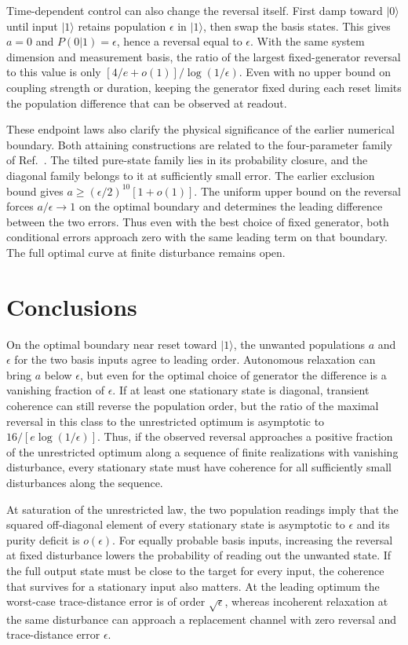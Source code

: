 \documentclass[aps,pra,reprint,amsmath,amssymb,nofootinbib,floatfix,longbibliography]{revtex4-2}
\theoremstyle{aps}
\newcommand{\eps}{\epsilon}
\newcommand{\ket}[1]{|#1\rangle}
\begin{document}
Time-dependent control can also change the reversal itself. First damp toward $\ket0$ until input $\ket1$ retains population $\eps$ in $\ket1$, then swap the basis states. This gives $a=0$ and $P(0|1)=\eps$, hence a reversal equal to $\eps$. With the same system dimension and measurement basis, the ratio of the largest fixed-generator reversal to this value is only $[4/e+o(1)]/\log(1/\eps)$. Even with no upper bound on coupling strength or duration, keeping the generator fixed during each reset limits the population difference that can be observed at readout.

These endpoint laws also clarify the physical significance of the earlier numerical boundary. Both attaining constructions are related to the four-parameter family of Ref.~\cite{Shahbeigi2024}. The tilted pure-state family lies in its probability closure, and the diagonal family belongs to it at sufficiently small error. The earlier exclusion bound gives $a\ge(\eps/2)^{10}[1+o(1)]$. The uniform upper bound on the reversal forces $a/\eps\to1$ on the optimal boundary and determines the leading difference between the two errors. Thus even with the best choice of fixed generator, both conditional errors approach zero with the same leading term on that boundary. The full optimal curve at finite disturbance remains open.

\section{Conclusions}\label{sec:conclusions}

On the optimal boundary near reset toward $\ket1$, the unwanted populations $a$ and $\eps$ for the two basis inputs agree to leading order. Autonomous relaxation can bring $a$ below $\eps$, but even for the optimal choice of generator the difference is a vanishing fraction of $\eps$. If at least one stationary state is diagonal, transient coherence can still reverse the population order, but the ratio of the maximal reversal in this class to the unrestricted optimum is asymptotic to $16/[e\log(1/\eps)]$. Thus, if the observed reversal approaches a positive fraction of the unrestricted optimum along a sequence of finite realizations with vanishing disturbance, every stationary state must have coherence for all sufficiently small disturbances along the sequence.

At saturation of the unrestricted law, the two population readings imply that the squared off-diagonal element of every stationary state is asymptotic to $\eps$ and its purity deficit is $o(\eps)$. For equally probable basis inputs, increasing the reversal at fixed disturbance lowers the probability of reading out the unwanted state. If the full output state must be close to the target for every input, the coherence that survives for a stationary input also matters. At the leading optimum the worst-case trace-distance error is of order $\sqrt\eps$, whereas incoherent relaxation at the same disturbance can approach a replacement channel with zero reversal and trace-distance error $\eps$.
\end{document}
